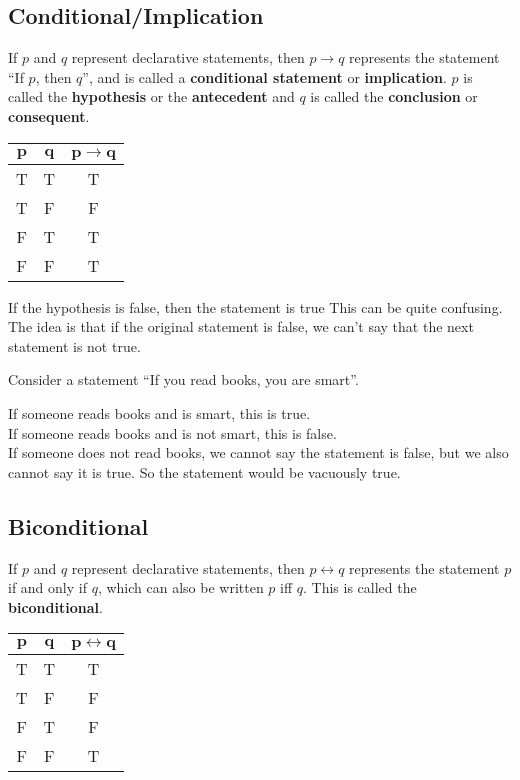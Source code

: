 \documentclass[../notes.tex]{subfiles}
\begin{document}
			\subsection[Conditional]{Conditional/Implication}
				If $p$ and $q$ represent declarative statements, then $p \rightarrow q$ represents the statement ``If $p$, then $q$'', and is called a \textbf{conditional statement} or \textbf{implication}. $p$ is called the \textbf{hypothesis} or the \textbf{antecedent} and $q$ is called the \textbf{conclusion} or \textbf{consequent}.
				\begin{center}
					\begin{tabular}{|c c | c|}
						\hline
						$\mathbf{p}$ & $\mathbf{q}$ & $\mathbf{p \rightarrow q}$\\
						\hline
						T & T & T\\
						T & F & F\\
						F & T & T\\
						F & F & T\\
						\hline
					\end{tabular}	
				\end{center}
				\begin{sidenote}{If the hypothesis is false, then the statement is true}
					This can be quite confusing. The idea is that if the original statement is false, we can't say that the next statement is not true.
					\begin{example}
						Consider a statement ``If you read books, you are smart''.
						\begin{adjustwidth}{1cm}{}
							If someone reads books and is smart, this is true.\\
							If someone reads books and is not smart, this is false.\\
							If someone does not read books, we cannot say the statement is false, but we also cannot say it is true. So the statement would be vacuously true.
						\end{adjustwidth}
					\end{example} 
				\end{sidenote}
			\pagebreak
			\subsection{Biconditional}
				If $p$ and $q$ represent declarative statements, then $p \leftrightarrow q$ represents the statement $p$ if and only if $q$, which can also be written $p$ iff $q$. This is called the \textbf{biconditional}.
				\begin{center}
					\begin{tabular}{|c c | c|}
						\hline
						$\mathbf{p}$ & $\mathbf{q}$ & $\mathbf{p \leftrightarrow q}$\\
						\hline
						T & T & T\\
						T & F & F\\
						F & T & F\\
						F & F & T\\
						\hline
					\end{tabular}	
				\end{center}
\end{document}

